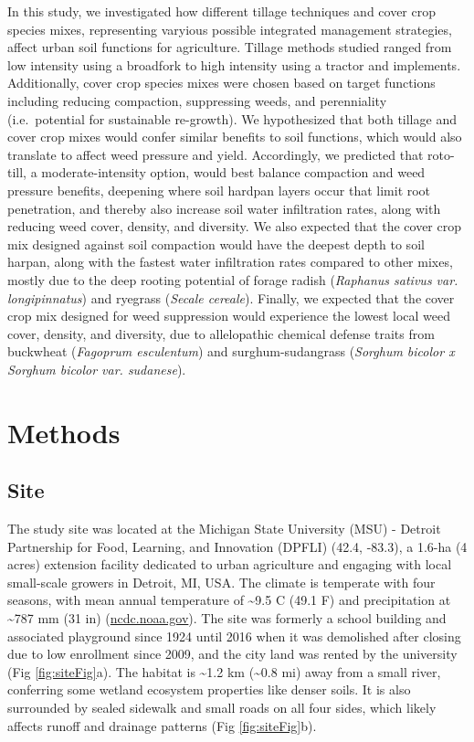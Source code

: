 \documentclass[
  12pt,
]{article}
\begin{document}
In this study, we investigated how different tillage techniques and cover crop species mixes, representing varyious possible integrated management strategies, affect urban soil functions for agriculture.
Tillage methods studied ranged from low intensity using a broadfork to high intensity using a tractor and implements.
Additionally, cover crop species mixes were chosen based on target functions including reducing compaction, suppressing weeds, and perenniality (i.e.~potential for sustainable re-growth).
We hypothesized that both tillage and cover crop mixes would confer similar benefits to soil functions, which would also translate to affect weed pressure and yield.
Accordingly, we predicted that roto-till, a moderate-intensity option, would best balance compaction and weed pressure benefits, deepening where soil hardpan layers occur that limit root penetration, and thereby also increase soil water infiltration rates, along with reducing weed cover, density, and diversity.
We also expected that the cover crop mix designed against soil compaction would have the deepest depth to soil harpan, along with the fastest water infiltration rates compared to other mixes, mostly due to the deep rooting potential of forage radish (\emph{Raphanus sativus var. longipinnatus}) and ryegrass (\emph{Secale cereale}).
Finally, we expected that the cover crop mix designed for weed suppression would experience the lowest local weed cover, density, and diversity, due to allelopathic chemical defense traits from buckwheat (\emph{Fagoprum esculentum}) and surghum-sudangrass (\emph{Sorghum bicolor x Sorghum bicolor var. sudanese}).

\hypertarget{methods}{%
\section{Methods}\label{methods}}

\hypertarget{site}{%
\subsection{Site}\label{site}}

The study site was located at the Michigan State University (MSU) - Detroit Partnership for Food, Learning, and Innovation (DPFLI) (42.4, -83.3), a 1.6-ha (4 acres) extension facility dedicated to urban agriculture and engaging with local small-scale growers in Detroit, MI, USA.
The climate is temperate with four seasons, with mean annual temperature of \textasciitilde9.5 C (49.1 F) and precipitation at \textasciitilde787 mm (31 in) (\url{ncdc.noaa.gov}).
The site was formerly a school building and associated playground since 1924 until 2016 when it was demolished after closing due to low enrollment since 2009, and the city land was rented by the university (Fig \ref{fig:siteFig}a).
The habitat is \textasciitilde1.2 km (\textasciitilde0.8 mi) away from a small river, conferring some wetland ecosystem properties like denser soils.
It is also surrounded by sealed sidewalk and small roads on all four sides, which likely affects runoff and drainage patterns (Fig \ref{fig:siteFig}b).
\end{document}
